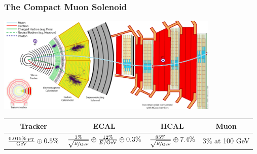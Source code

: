\documentclass[aspectratio=169,xcolor=dvipsnames,,table,compress]{beamer}
\begin{document}
\begin{frame}[t]
\begin{columns}[T]
\begin{column}{0.6\textwidth}
    \vspace{-35mm}\hspace{10mm}
  \end{column}
  \end{columns}
\end{frame}

\begin{frame} \frametitle{The Compact Muon Solenoid}
  \vspace{-7mm}
  \centering 
  \includegraphics[width=0.8\textwidth]{../figures/talk/cms_transverse.png} \\ 
  \begin{tabular}{c|c|c|c}
    Tracker & ECAL & HCAL & Muon \\ 
     \hline 
     $\frac{0.015\%\cdot p_\text{T}}{\mathrm{GeV}} \oplus 0.5\%$ &
     $\frac{3\%}{\sqrt{\nicefrac{E}{\mathrm{GeV}}}} \oplus \frac{12\%}{E/\mathrm{GeV}} \oplus 0.3\%$ & 
     $\frac{85\%}{\sqrt{\nicefrac{E}{\mathrm{GeV}}}} \oplus 7.4\%$ &
     $3\%$ at 100 GeV
  \end{tabular}
\end{frame}
\end{document}
